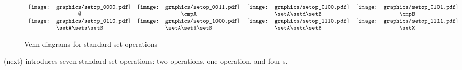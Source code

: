 \begin{figure}
  \centering%
  $\begin{array}{*{4}{c}}
      \texttt{[image: graphics/setop\_0000.pdf]}%
     &\texttt{[image: graphics/setop\_0011.pdf]}%
     &\texttt{[image: graphics/setop\_0100.pdf]}%
     &\texttt{[image: graphics/setop\_0101.pdf]}%
    \\%
      \emptyset
     &\cmpA
     &\setA\setd\setB
     &\cmpB
    \\%
      \texttt{[image: graphics/setop\_0110.pdf]}%
     &\texttt{[image: graphics/setop\_1000.pdf]}%
     &\texttt{[image: graphics/setop\_1110.pdf]}%
     &\texttt{[image: graphics/setop\_1111.pdf]}%
    \\%
      \setA\sets\setB
     &\setA\seti\setB
     &\setA\setu\setB
     &\setX
  \end{array}$
  \caption{Venn diagrams for standard set operations  \label{fig:setops}}
\end{figure}
 (next) introduces seven standard set operations: %
two  operations, one  operation, and four s.
